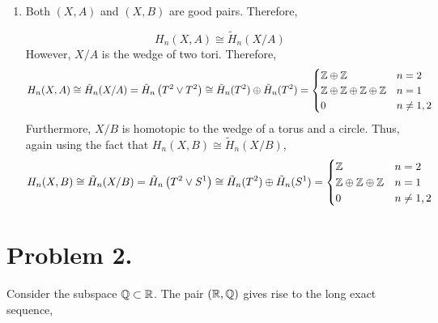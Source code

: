 \documentclass[12pt]{extarticle}
\begin{document}
\begin{enumerate}
\item Both $(X, A)$ and $(X, B)$ are good pairs. Therefore,  

\[ H_n(X, A) \cong \tilde{H}_n(X/A) \]
However, $X/A$ is the wedge of two tori. Therefore,
\[ H_n(X, A) \cong \tilde{H}_n(X/A) = \tilde{H}_n \left( T^2 \vee T^2 \right) \cong \tilde{H}_n(T^2) \oplus \tilde{H}_n(T^2) = 
\begin{cases}
\mathbb{Z} \oplus \mathbb{Z} & n = 2 \\
\mathbb{Z} \oplus \mathbb{Z} \oplus \mathbb{Z} \oplus \mathbb{Z} & n = 1 \\
0 & n \neq 1,2 
\end{cases} \]
Furthermore, $X/B$ is homotopic to the wedge of a torus and a circle. Thus, again using the fact that $H_n(X, B) \cong \tilde{H}_n(X/B)$,
\[ H_n(X, B) \cong \tilde{H}_n(X/B) = \tilde{H}_n \left( T^2 \vee S^1 \right) \cong \tilde{H}_n(T^2) \oplus \tilde{H}_n(S^1) = 
\begin{cases}
\mathbb{Z} & n = 2 \\
\mathbb{Z} \oplus \mathbb{Z} \oplus \mathbb{Z} & n = 1 \\
0 & n \neq 1,2 
\end{cases} \]
\end{enumerate}

\section*{Problem 2.}

Consider the subspace $\mathbb{Q} \subset \mathbb{R}$. The pair $(\mathbb{R}, \mathbb{Q})$ gives rise to the long exact sequence,
\end{document}
